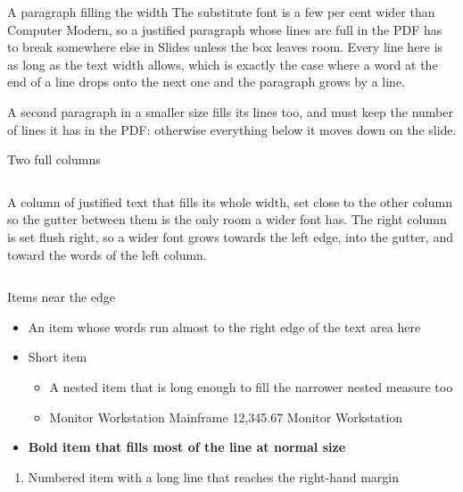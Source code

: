 \documentclass{beamer}
\begin{document}
\begin{frame}[label=full-width]{A paragraph filling the width}
  The substitute font is a few per cent wider than Computer Modern, so a justified paragraph
  whose lines are full in the PDF has to break somewhere else in Slides unless the box leaves
  room. Every line here is as long as the text width allows, which is exactly the case where
  a word at the end of a line drops onto the next one and the paragraph grows by a line.

  \small A second paragraph in a smaller size fills its lines too, and must keep the number of
  lines it has in the PDF: otherwise everything below it moves down on the slide.
\end{frame}

\begin{frame}[label=columns]{Two full columns}
  \begin{columns}[T]
    A column of justified text that fills its whole width, set close to the other column so
    the gutter between them is the only room a wider font has.
    \raggedleft The right column is set flush right, so a wider font grows towards the left
    edge, into the gutter, and toward the words of the left column.
  \end{columns}
\end{frame}

\begin{frame}[label=items]{Items near the edge}
  \begin{itemize}
    \item An item whose words run almost to the right edge of the text area here
    \item Short item
    \begin{itemize}
      \item A nested item that is long enough to fill the narrower nested measure too
      \item Monitor Workstation Mainframe 12,345.67 Monitor Workstation
    \end{itemize}
    \item \textbf{Bold item that fills most of the line at normal size}
  \end{itemize}
  \begin{enumerate}
    \item Numbered item with a long line that reaches the right-hand margin
  \end{enumerate}
\end{frame}
\end{document}
